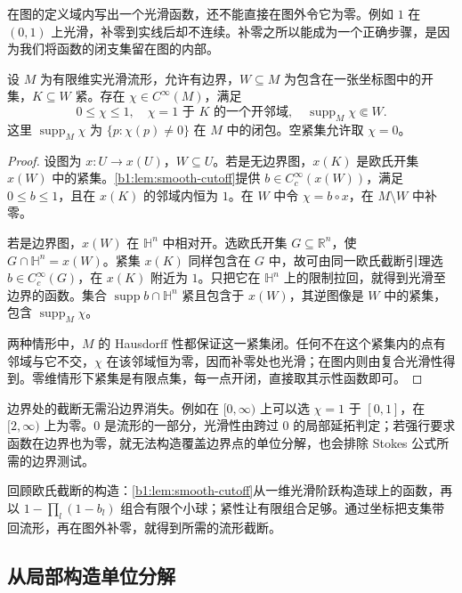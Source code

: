 在图的定义域内写出一个光滑函数，还不能直接在图外令它为零。例如 \(1\) 在 \((0,1)\) 上光滑，补零到实线后却不连续。补零之所以能成为一个正确步骤，是因为我们将函数的闭支集留在图的内部。

\begin{lemma}[坐标图中的光滑截断]\label{b1:lem:E-chart-cutoff}
设 \(M\) 为有限维实光滑流形，允许有边界，\(W\subseteq M\) 为包含在一张坐标图中的开集，\(K\subseteq W\) 紧。存在 \(\chi\in C^\infty(M)\)，满足
\[
 0\leq\chi\leq1,\quad
 \chi=1\text{ 于 }K\text{ 的一个开邻域},\quad
 \operatorname{supp}_M\chi\Subset W.
\]
这里 \(\operatorname{supp}_M\chi\) 为 \(\{p:\chi(p)\ne0\}\) 在 \(M\) 中的闭包。空紧集允许取 \(\chi=0\)。
\end{lemma}
\begin{proof}
设图为 \(x:U\rightarrow x(U)\)，\(W\subseteq U\)。若是无边界图，\(x(K)\) 是欧氏开集 \(x(W)\) 中的紧集。\cref{b1:lem:smooth-cutoff}提供 \(b\in C_c^\infty(x(W))\)，满足 \(0\leq b\leq1\)，且在 \(x(K)\) 的邻域内恒为 \(1\)。在 \(W\) 中令 \(\chi=b\circ x\)，在 \(M\setminus W\) 中补零。

若是边界图，\(x(W)\) 在 \(\mathbb H^n\) 中相对开。选欧氏开集 \(G\subseteq\mathbb R^n\)，使 \(G\cap\mathbb H^n=x(W)\)。紧集 \(x(K)\) 同样包含在 \(G\) 中，故可由同一欧氏截断引理选 \(b\in C_c^\infty(G)\)，在 \(x(K)\) 附近为 \(1\)。只把它在 \(\mathbb H^n\) 上的限制拉回，就得到光滑至边界的函数。集合 \(\operatorname{supp}b\cap\mathbb H^n\) 紧且包含于 \(x(W)\)，其逆图像是 \(W\) 中的紧集，包含 \(\operatorname{supp}_M\chi\)。

两种情形中，\(M\) 的 Hausdorff 性都保证这一紧集闭。任何不在这个紧集内的点有邻域与它不交，\(\chi\) 在该邻域恒为零，因而补零处也光滑；在图内则由复合光滑性得到。零维情形下紧集是有限点集，每一点开闭，直接取其示性函数即可。
\end{proof}

边界处的截断无需沿边界消失。例如在 \([0,\infty)\) 上可以选 \(\chi=1\) 于 \([0,1]\)，在 \([2,\infty)\) 上为零。\(0\) 是流形的一部分，光滑性由跨过 \(0\) 的局部延拓判定；若强行要求函数在边界也为零，就无法构造覆盖边界点的单位分解，也会排除 Stokes 公式所需的边界测试。

\ProseParagraphBreak

回顾欧氏截断的构造：\cref{b1:lem:smooth-cutoff}从一维光滑阶跃构造球上的函数，再以 \(1-\prod_l(1-b_l)\) 组合有限个小球；紧性让有限组合足够。通过坐标把支集带回流形，再在图外补零，就得到所需的流形截断。

\subsection{从局部构造单位分解}
\label{b1:subsec:E10203}

